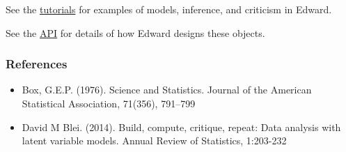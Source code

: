 See the \href{tutorials.html}{tutorials} for examples of models,
inference, and criticism in Edward.

See the \href{#}{API} for details of how Edward designs these objects.

\subsubsection{References}\label{references}

\begin{itemize}
\item
  Box, G.E.P. (1976). Science and Statistics. Journal of the American
  Statistical Association, 71(356), 791–799
\item
  David M Blei. (2014). Build, compute, critique, repeat: Data analysis with
  latent variable models. Annual Review of Statistics, 1:203-232
\end{itemize}
